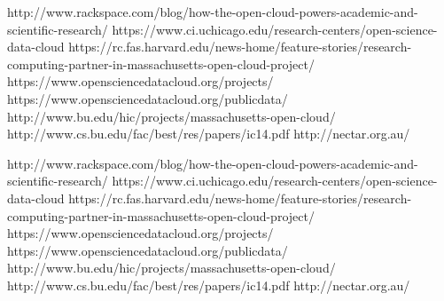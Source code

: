 http://www.rackspace.com/blog/how-the-open-cloud-powers-academic-and-scientific-research/
https://www.ci.uchicago.edu/research-centers/open-science-data-cloud
https://rc.fas.harvard.edu/news-home/feature-stories/research-computing-partner-in-massachusetts-open-cloud-project/
https://www.opensciencedatacloud.org/projects/
https://www.opensciencedatacloud.org/publicdata/
http://www.bu.edu/hic/projects/massachusetts-open-cloud/
http://www.cs.bu.edu/fac/best/res/papers/ic14.pdf
http://nectar.org.au/

http://www.rackspace.com/blog/how-the-open-cloud-powers-academic-and-scientific-research/
https://www.ci.uchicago.edu/research-centers/open-science-data-cloud
https://rc.fas.harvard.edu/news-home/feature-stories/research-computing-partner-in-massachusetts-open-cloud-project/
https://www.opensciencedatacloud.org/projects/
https://www.opensciencedatacloud.org/publicdata/
http://www.bu.edu/hic/projects/massachusetts-open-cloud/
http://www.cs.bu.edu/fac/best/res/papers/ic14.pdf
http://nectar.org.au/
